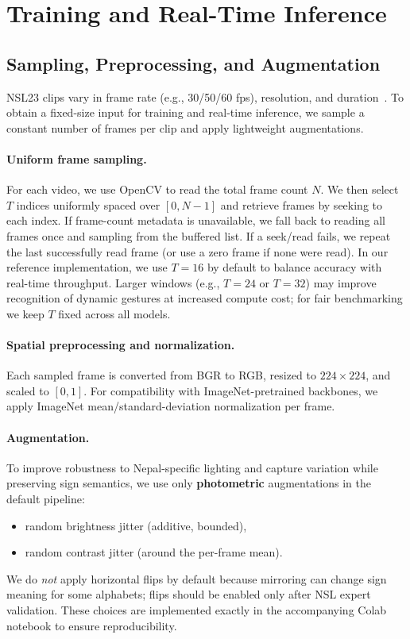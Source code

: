 \documentclass[conference]{IEEEtran}
\begin{document}
\section{Training and Real-Time Inference}
\subsection{Sampling, Preprocessing, and Augmentation}
NSL23 clips vary in frame rate (e.g., 30/50/60 fps), resolution, and duration~\cite{sunuwar2024dib}. To obtain a fixed-size input for training and real-time inference, we sample a constant number of frames per clip and apply lightweight augmentations.

\paragraph{Uniform frame sampling.}
For each video, we use OpenCV to read the total frame count $N$. We then select $T$ indices uniformly spaced over $[0, N\!-\!1]$ and retrieve frames by seeking to each index. If frame-count metadata is unavailable, we fall back to reading all frames once and sampling from the buffered list. If a seek/read fails, we repeat the last successfully read frame (or use a zero frame if none were read). In our reference implementation, we use $T\!=\!16$ by default to balance accuracy with real-time throughput. Larger windows (e.g., $T\!=\!24$ or $T\!=\!32$) may improve recognition of dynamic gestures at increased compute cost; for fair benchmarking we keep $T$ fixed across all models.

\paragraph{Spatial preprocessing and normalization.}
Each sampled frame is converted from BGR to RGB, resized to $224\times224$, and scaled to $[0,1]$. For compatibility with ImageNet-pretrained backbones, we apply ImageNet mean/standard-deviation normalization per frame.

\paragraph{Augmentation.}
To improve robustness to Nepal-specific lighting and capture variation while preserving sign semantics, we use only \textbf{photometric} augmentations in the default pipeline:
\begin{itemize}
\item random brightness jitter (additive, bounded),
\item random contrast jitter (around the per-frame mean).
\end{itemize}
We do \emph{not} apply horizontal flips by default because mirroring can change sign meaning for some alphabets; flips should be enabled only after NSL expert validation. These choices are implemented exactly in the accompanying Colab notebook to ensure reproducibility.
\end{document}
